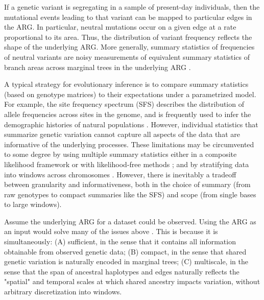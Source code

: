 If a genetic variant is segregating in a sample of present-day individuals, 
then the mutational events leading to that variant can be mapped to particular edges in the ARG. 
In particular, neutral mutations occur on a given edge at a rate proportional to its area.
Thus, the distribution of variant frequency reflects the shape of the underlying ARG. 
More generally, summary statistics of frequencies of neutral variants are noisy measurements of
equivalent summary statistics of branch areas across marginal trees in the underlying ARG \citep{ralph_efficiently_2020}.

A typical strategy for evolutionary inference is to compare summary statistics (based on genotype matrices) to their expectations under a parametrized model.
For example, the site frequency spectrum (SFS) describes the distribution of allele frequencies across sites in the genome,
and is frequently used to infer the demographic histories of natural populations \citep{gutenkunst_inferring_2009, schraiber_methods_2015}.
However, individual statistics that summarize genetic variation cannot capture all aspects of the data that are informative of the underlying processes.
These limitations may be circumvented to some degree by using multiple summary statistics either in a composite likelihood framework or with likelihood-free methods \citep{nielsen_genomic_2005, degiorgio_sweepfinder2_2016, sheehan_deep_2016, caldas_inference_2022, pavlidis_sweed_2013};
and by stratifying data into windows across chromosomes \citep{schrider_shic_2016, flagel_unreasonable_2019, sheehan_deep_2016}.
However, there is inevitably a tradeoff between granularity and informativeness,
both in the choice of summary (from raw genotypes to compact summaries like the SFS) and scope (from single bases to large windows).

Assume the underlying ARG for a dataset could be observed. 
Using the ARG as an input would solve many of the issues above \citep{rasmussen_genome-wide_2014}. 
This is because it is simultaneously: 
(A) sufficient, in the sense that it contains all information obtainable from observed genetic data; 
(B) compact, in the sense that shared genetic variation is naturally encoded in marginal trees; 
(C) multiscale, in the sense that the span of ancestral haplotypes and edges naturally reflects the "spatial" and temporal scales at which shared ancestry impacts variation, without arbitrary discretization into windows.


